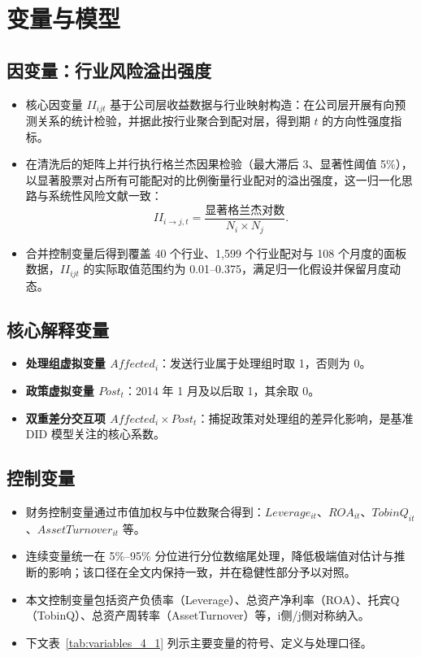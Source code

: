 \section{变量与模型}
\label{sec:variable_definition}

\subsection{因变量：行业风险溢出强度}
\begin{itemize}
    \item 核心因变量 \(II_{ijt}\) 基于公司层收益数据与行业映射构造：在公司层开展有向预测关系的统计检验，并据此按行业聚合到配对层，得到期 \(t\) 的方向性强度指标。
    \item 在清洗后的矩阵上并行执行格兰杰因果检验（最大滞后 3、显著性阈值 5\%），以显著股票对占所有可能配对的比例衡量行业配对的溢出强度，这一归一化思路与系统性风险文献一致\citep{billio2012econometric,diebold2012better,diebold2014connectedness}：
    \begin{equation}
        II_{i\rightarrow j,t} = \frac{\text{显著格兰杰对数}}{N_i \times N_j}.
    \end{equation}
    \item 合并控制变量后得到覆盖 40 个行业、1,599 个行业配对与 108 个月度的面板数据，\(II_{ijt}\) 的实际取值范围约为 0.01--0.375，满足归一化假设并保留月度动态。

\end{itemize}

\subsection{核心解释变量}
\begin{itemize}
    \item \textbf{处理组虚拟变量 \(Affected_i\)}：发送行业属于处理组时取 1，否则为 0。
    \item \textbf{政策虚拟变量 \(Post_t\)}：2014 年 1 月及以后取 1，其余取 0。
    \item \textbf{双重差分交互项 \(Affected_i \times Post_t\)}：捕捉政策对处理组的差异化影响，是基准 DID 模型关注的核心系数。
\end{itemize}

\subsection{控制变量}
\begin{itemize}
    \item 财务控制变量通过市值加权与中位数聚合得到：$Leverage_{it}$、$ROA_{it}$、$TobinQ_{it}$、$AssetTurnover_{it}$ 等。
    \item 连续变量统一在 5\%--95\% 分位进行分位数缩尾处理，降低极端值对估计与推断的影响；该口径在全文内保持一致，并在稳健性部分予以对照。
    \item 本文控制变量包括资产负债率（Leverage）、总资产净利率（ROA）、托宾Q（TobinQ）、总资产周转率（AssetTurnover）等，i侧/j侧对称纳入。
    \item 下文表~\ref{tab:variables_4_1} 列示主要变量的符号、定义与处理口径。
\end{itemize}

